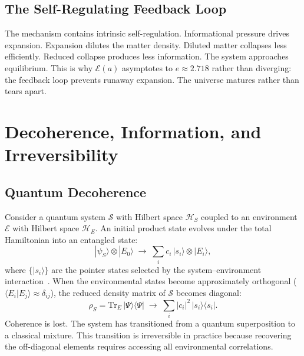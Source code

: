 \documentclass[11pt]{article}
\begin{document}
\subsection{The Self-Regulating Feedback Loop}

The mechanism contains intrinsic self-regulation. Informational pressure drives expansion. Expansion dilutes the matter density. Diluted matter collapses less efficiently. Reduced collapse produces less information. The system approaches equilibrium. This is why $\mathcal{E}(a)$ asymptotes to $e \approx 2.718$ rather than diverging: the feedback loop prevents runaway expansion. The universe matures rather than tears apart.


\section{Decoherence, Information, and Irreversibility}
\label{sec:decoherence}

\subsection{Quantum Decoherence}

Consider a quantum system $\mathcal{S}$ with Hilbert space $\mathcal{H}_S$
coupled to an environment $\mathcal{E}$ with Hilbert space $\mathcal{H}_E$.
An initial product state evolves under the total
Hamiltonian into an entangled state:
\begin{equation}
|\psi_S\rangle \otimes |E_0\rangle \;\longrightarrow\;
\sum_i c_i\,|s_i\rangle \otimes |E_i\rangle,
\label{eq:decoherence}
\end{equation}
where $\{|s_i\rangle\}$ are the pointer states selected by the
system--environment interaction~\citep{Zurek2003}.  When the environmental
states become approximately orthogonal
($\langle E_i | E_j \rangle \approx \delta_{ij}$), the reduced density
matrix of $\mathcal{S}$ becomes diagonal:
\begin{equation}
\rho_S = \mathrm{Tr}_E\,|\Psi\rangle\langle\Psi|
\;\longrightarrow\; \sum_i |c_i|^2\,|s_i\rangle\langle s_i|.
\label{eq:reduced_density}
\end{equation}
Coherence is lost.  The system has transitioned from a quantum superposition
to a classical mixture.  This transition is irreversible in practice because
recovering the off-diagonal elements requires accessing all environmental
correlations.
\end{document}
